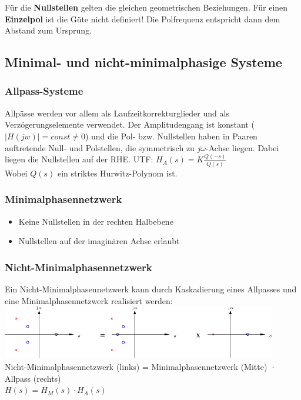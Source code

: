   Für die \textbf{Nullstellen} gelten die gleichen geometrischen Beziehungen.
  Für einen \textbf{Einzelpol} ist die Güte nicht definiert! Die Polfrequenz entspricht dann dem Abstand zum Ursprung.
  
  

\subsection{Minimal- und nicht-minimalphasige Systeme }
\subsubsection{Allpass-Systeme}
Allpässe werden vor allem als Laufzeitkorrekturglieder und als
Verzögerungselemente verwendet. Der Amplitudengang ist konstant ($|H(jw)| =
const \neq 0$) und die Pol- bzw. Nullstellen haben in Paaren auftretende Null-
und Polstellen, die symmetrisch zu $j \omega$-Achse liegen. Dabei liegen die
Nullstellen auf der RHE.
UTF: $H_A(s) = K \frac{Q(-s)}{Q(s)}$ \\
Wobei $Q(s)$ ein striktes Hurwitz-Polynom ist.



\subsubsection{Minimalphasennetzwerk }
\begin{itemize}
  \item Keine Nullstellen in der rechten Halbebene
  \item Nullstellen auf der imaginären Achse erlaubt
\end{itemize}


\subsubsection{Nicht-Minimalphasennetzwerk}
Ein Nicht-Minimalphasennetzwerk kann durch Kaskadierung eines Allpasses und
eine Minimalphasennetzwerk realisiert werden:\\
\includegraphics[width=12cm]{./images/nicht-minimalphasennetzwerk.png}\\
Nicht-Minimalphasennetzwerk (links) = Minimalphasennetzwerk (Mitte) · Allpass (rechts) \\
$H(s) = H_M(s) \cdot H_A(s)$

